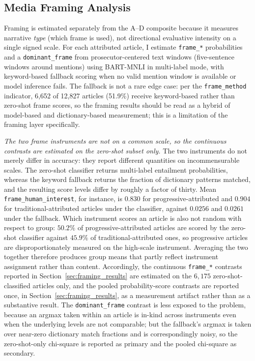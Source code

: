 \documentclass[12pt, letterpaper]{article}
\begin{document}
\subsection{Media Framing Analysis}
\label{sec:framing_methods}

Framing is estimated separately from the A--D composite because it measures narrative \emph{type} (which frame is used), not directional evaluative intensity on a single signed scale. For each attributed article, I estimate \texttt{frame\_*} probabilities and a \texttt{dominant\_frame} from prosecutor-centered text windows (five-sentence windows around mentions) using BART-MNLI in multi-label mode, with keyword-based fallback scoring when no valid mention window is available or model inference fails. The fallback is not a rare edge case: per the \texttt{frame\_method} indicator, 6{,}652 of 12{,}827 articles (51.9\%) receive keyword-based rather than zero-shot frame scores, so the framing results should be read as a hybrid of model-based and dictionary-based measurement; this is a limitation of the framing layer specifically.

\emph{The two frame instruments are not on a common scale, so the continuous contrasts are estimated on the zero-shot subset only.} The two instruments do not merely differ in accuracy: they report different quantities on incommensurable scales. The zero-shot classifier returns multi-label entailment probabilities, whereas the keyword fallback returns the fraction of dictionary patterns matched, and the resulting score levels differ by roughly a factor of thirty. Mean \texttt{frame\_human\_interest}, for instance, is $0.830$ for progressive-attributed and $0.904$ for traditional-attributed articles under the classifier, against $0.0256$ and $0.0261$ under the fallback. Which instrument scores an article is also not random with respect to group: $50.2\%$ of progressive-attributed articles are scored by the zero-shot classifier against $45.9\%$ of traditional-attributed ones, so progressive articles are disproportionately measured on the high-scale instrument. Averaging the two together therefore produces group means that partly reflect instrument assignment rather than content. Accordingly, the continuous \texttt{frame\_*} contrasts reported in Section~\ref{sec:framing_results} are estimated on the $6{,}175$ zero-shot-classified articles only, and the pooled probability-score contrasts are reported once, in Section~\ref{sec:framing_results}, as a measurement artifact rather than as a substantive result. The \texttt{dominant\_frame} contrast is less exposed to the problem, because an argmax taken within an article is in-kind across instruments even when the underlying levels are not comparable; but the fallback's argmax is taken over near-zero dictionary match fractions and is correspondingly noisy, so the zero-shot-only chi-square is reported as primary and the pooled chi-square as secondary.
\end{document}
